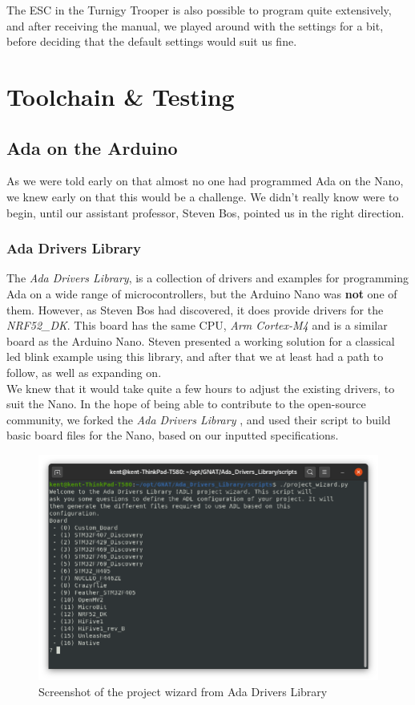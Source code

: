 \documentclass{article}
\begin{document}
The ESC in the Turnigy Trooper is also possible to program quite extensively, and after receiving the manual, we played around with the settings for a bit, before deciding that the default settings would suit us fine.

\section{Toolchain \& Testing}
\subsection{Ada on the Arduino}
As we were told early on that almost no one had programmed Ada on the Nano, we knew early on that this would be a challenge. We didn't really know were to begin, until our assistant professor, Steven Bos, pointed us in the right direction.

\subsubsection{Ada Drivers Library}

The \textit{Ada Drivers Library}, is a collection of drivers and examples for programming Ada on a wide range of microcontrollers, but the Arduino Nano was \textbf{not} one of them. However, as Steven Bos had discovered, it does provide drivers for the \textit{NRF52\_DK}. This board has the same CPU, \textit{Arm Cortex-M4} and is a similar board as the Arduino Nano. Steven presented a working solution for a classical led blink example using this library, and after that we at least had a path to follow, as well as expanding on.\\

We knew that it would take quite a few hours to adjust the existing drivers, to suit the Nano. In the hope of being able to contribute to the open-source community, we forked the \textit{Ada Drivers Library}
, and used their script to build basic board files for the Nano, based on our inputted specifications.

\begin{figure}[H]
  \centering
  \includegraphics[width=\linewidth]{projectwizard.png}
  \caption{Screenshot of the project wizard from Ada Drivers Library}
  \label{projectWizard}
\end{figure}
\end{document}
